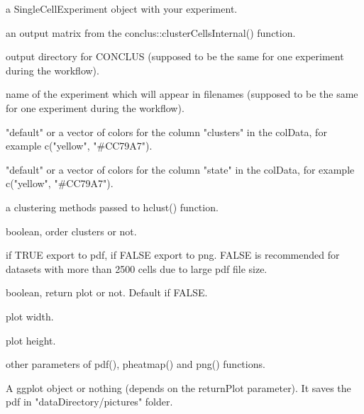 \documentclass[a4paper]{book}
\begin{document}
\begin{Arguments}
\begin{ldescription}
\item[\code{sceObject}] a SingleCellExperiment object with your experiment.

\item[\code{cellsSimilarityMatrix}] an output matrix from the conclus::clusterCellsInternal() function.

\item[\code{dataDirectory}] output directory for CONCLUS (supposed to be the same for one experiment during the workflow).

\item[\code{experimentName}] name of the experiment which will appear in filenames (supposed to be the same for one experiment during the workflow).

\item[\code{colorPalette}] "default" or a vector of colors for the column "clusters" in the colData, for example c("yellow", "\#CC79A7").

\item[\code{statePalette}] "default" or a vector of colors for the column "state" in the colData, for example c("yellow", "\#CC79A7").

\item[\code{clusteringMethod}] a clustering methods passed to hclust() function.

\item[\code{orderClusters}] boolean, order clusters or not.

\item[\code{plotPDF}] if TRUE export to pdf, if FALSE export to png. 
FALSE is recommended for datasets with more than 2500 cells due to large pdf file size.

\item[\code{returnPlot}] boolean, return plot or not. Default if FALSE.

\item[\code{width}] plot width.

\item[\code{height}] plot height.

\item[\code{...}] other parameters of pdf(), pheatmap() and png() functions.
\end{ldescription}
\end{Arguments}
%
\begin{Value}
A ggplot object or nothing (depends on the returnPlot parameter).
It saves the pdf in "dataDirectory/pictures" folder.
\end{Value}
\end{document}
